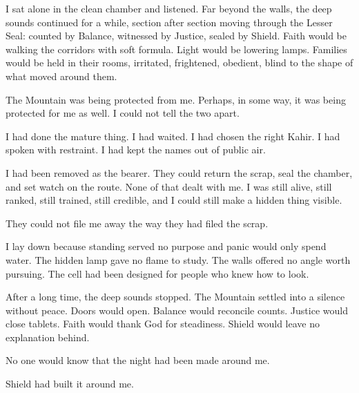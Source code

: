 I sat alone in the clean chamber and listened. Far beyond the walls, the deep sounds continued for a while, section after section moving through the Lesser Seal: counted by Balance, witnessed by Justice, sealed by Shield. Faith would be walking the corridors with soft formula. Light would be lowering lamps. Families would be held in their rooms, irritated, frightened, obedient, blind to the shape of what moved around them.\par

The Mountain was being protected from me. Perhaps, in some way, it was being protected for me as well. I could not tell the two apart.\par

I had done the mature thing. I had waited. I had chosen the right Kahir. I had spoken with restraint. I had kept the names out of public air.\par

I had been removed as the bearer. They could return the scrap, seal the chamber, and set watch on the route. None of that dealt with me. I was still alive, still ranked, still trained, still credible, and I could still make a hidden thing visible.\par

They could not file me away the way they had filed the scrap.\par

I lay down because standing served no purpose and panic would only spend water. The hidden lamp gave no flame to study. The walls offered no angle worth pursuing. The cell had been designed for people who knew how to look.\par

After a long time, the deep sounds stopped. The Mountain settled into a silence without peace. Doors would open. Balance would reconcile counts. Justice would close tablets. Faith would thank God for steadiness. Shield would leave no explanation behind.\par

No one would know that the night had been made around me.\par

Shield had built it around me.\par

\ornament

